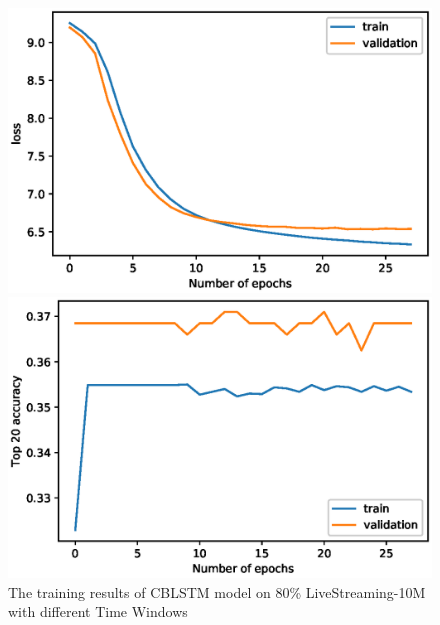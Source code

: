 \documentclass[runningheads]{llncs}
\begin{document}
\begin{figure}[!htb]
   \begin{minipage}{0.48\textwidth}
     \centering
     \includegraphics[width=\linewidth]{image/model_loss.eps}
   \end{minipage}\hfill
   \begin {minipage}{0.48\textwidth}
     \centering
     \includegraphics[width=\linewidth]{image/Top_20_accuracy.eps}
   \end{minipage}
   \caption{The training results of CBLSTM model on 80\% LiveStreaming-10M with different Time Windows}
\end{figure}

\end{document}
